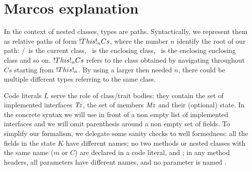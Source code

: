 \begin{comment}
Define operations on p
--------------------------------------
p.evilPush(L) = (C = L, p)
for fresh C

p.push(id) = (id = L, p)
p = (id' = {_;_, id = L, _ ;_}, _; Ds)

(id = L, p).pop() = p
(id = L, p).top() = L

Define equivy ops...
------------------------------
empty =p empty
P, Ps =p P', Ps' iff:
p.minimize(P) = p.minimize(P')
Ps =p Ps'

Pz subseteq_p Pz' iff:
p.minimize(Pz) subseteq p.minimize(Pz')

p.minimize(empty) = empty
p.minimize(P, Pz) = p.minimize(P), p.minimize(Pz)

p.minimize(Thisn+1.idn.Cs) = p.minimize(Thisn.Cs):
p = id0 = L0, ..., idn = Ln, _; Ds
p(Thisn.Cs) = L
// TODO: Check that Ln is an LV instead?

otherwise p.minimize(P) = P

define dom(\Mz) = Midz
===========================================
dom(empty) = empty
dom(C = E, \Mz) = C, dom(\Mz)
dom(T m(\Txs), \Mz) = m, dom(\Mz)
\end{comment}


\clearpage
\section{Marcos explanation}
In the context of nested classes, types are paths. Syntactically,
we represent them as relative paths of form 
$\This{n}{Cs}$, where the number $n$ identify the root of our path:
\Q@This@/\ is the current class, \ is the enclosing class, \ is the enclosing enclosing class and so on. $\This{n}{Cs}$
refers to the class obtained by navigating throughout  $Cs$ starting from $\This{n}$.
By using a larger then needed $n$, there could be multiple different types referring to the same class.

Code literals $L$
serve the role of class/trait bodies; they contain the set of implemented interfaces
$\mathit{Tz}$, the set of members $\mathit{Mz}$ and their (optional) state.
In the concrete syntax we will use \Q@implements@ in front of a non empty list of implemented interfaces
and we will omit parenthesis around a non empty set of fields.
To simplify our formalism, we delegate some sanity checks to well formedness: all the fields in the state $K$ have different names;
no two methods or nested classes with the same name ($m$ or $C$) are declared in a code literal,
and ;
in any method headers, all parameters have different names, and no parameter is named \Q@this@.

